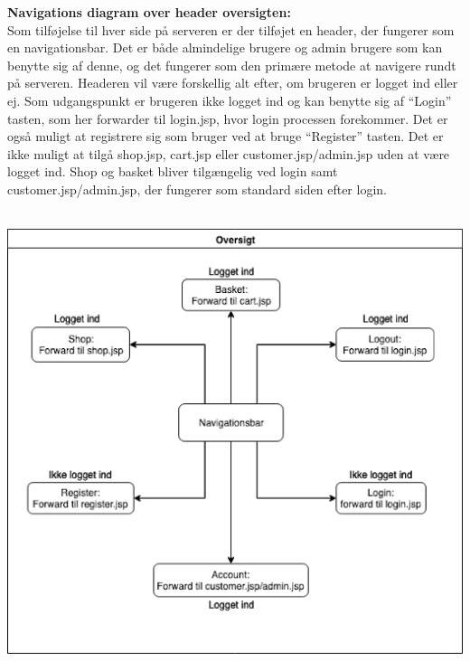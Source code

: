 \documentclass[11pt]{report}
\begin{document}
\noindent
\textbf{Navigations diagram over header oversigten:}\\
Som tilføjelse til hver side på serveren er der tilføjet en header,
der fungerer som en navigationsbar. Det er både almindelige brugere og
admin brugere som kan benytte sig af denne, og det fungerer som den
primære metode at navigere rundt på serveren. Headeren vil være forskellig alt efter, om brugeren er logget ind eller ej. Som udgangspunkt er brugeren ikke logget ind og kan benytte sig af “Login” tasten, som her forwarder til login.jsp, hvor login processen forekommer. Det er også muligt at registrere sig som bruger ved at bruge “Register” tasten.
Det er ikke muligt at tilgå shop.jsp, cart.jsp eller
customer.jsp/admin.jsp uden at være logget ind. Shop og basket bliver
tilgængelig ved login samt customer.jsp/admin.jsp, der fungerer som
standard siden efter login.\\\\
\begin{center}
\includegraphics[width=15cm]{HeaderCupCake.png}
\end{center}
\end{document}
